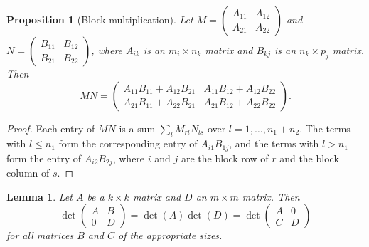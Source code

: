 \documentclass[11pt]{article}
\theoremstyle{definition}
\theoremstyle{plain}
\newtheorem{proposition}[definition]{Proposition}
\newtheorem{lemma}[definition]{Lemma}
\theoremstyle{remark}
\begin{document}
\begin{proposition}[Block multiplication]\label{prop:block-mult}
    Let $M = \begin{pmatrix} A_{11} & A_{12} \\ A_{21} & A_{22} \end{pmatrix}$ and $N = \begin{pmatrix} B_{11} & B_{12} \\ B_{21} & B_{22} \end{pmatrix}$, where $A_{ik}$ is an $m_i \times n_k$ matrix and $B_{kj}$ is an $n_k \times p_j$ matrix. Then
    \[MN = \begin{pmatrix} A_{11}B_{11} + A_{12}B_{21} & A_{11}B_{12} + A_{12}B_{22} \\ A_{21}B_{11} + A_{22}B_{21} & A_{21}B_{12} + A_{22}B_{22} \end{pmatrix}.\]
\end{proposition}

\begin{proof}
    Each entry of $MN$ is a sum $\sum_l M_{rl}N_{ls}$ over $l = 1, \ldots, n_1 + n_2$. The terms with $l \leq n_1$ form the corresponding entry of $A_{i1}B_{1j}$, and the terms with $l > n_1$ form the entry of $A_{i2}B_{2j}$, where $i$ and $j$ are the block row of $r$ and the block column of $s$.
\end{proof}

\begin{lemma}\label{lem:block-triangular}
    Let $A$ be a $k \times k$ matrix and $D$ an $m \times m$ matrix. Then
    \[\det\begin{pmatrix} A & B \\ 0 & D \end{pmatrix} = \det(A)\det(D) = \det\begin{pmatrix} A & 0 \\ C & D \end{pmatrix}\]
    for all matrices $B$ and $C$ of the appropriate sizes.
\end{lemma}
\end{document}
